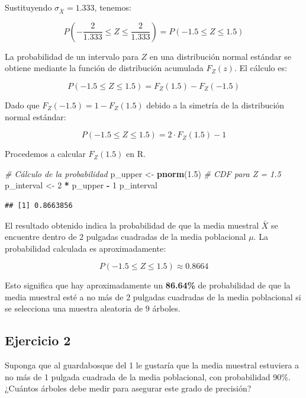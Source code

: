 \documentclass[
]{article}
\newenvironment{Shaded}{\begin{snugshade}}{\end{snugshade}}
\newcommand{\CommentTok}[1]{\textcolor[rgb]{0.56,0.35,0.01}{\textit{#1}}}
\newcommand{\DecValTok}[1]{\textcolor[rgb]{0.00,0.00,0.81}{#1}}
\newcommand{\FloatTok}[1]{\textcolor[rgb]{0.00,0.00,0.81}{#1}}
\newcommand{\FunctionTok}[1]{\textcolor[rgb]{0.13,0.29,0.53}{\textbf{#1}}}
\newcommand{\NormalTok}[1]{#1}
\newcommand{\OtherTok}[1]{\textcolor[rgb]{0.56,0.35,0.01}{#1}}
\newcommand{\SpecialCharTok}[1]{\textcolor[rgb]{0.81,0.36,0.00}{\textbf{#1}}}
\begin{document}
Sustituyendo \(\sigma_{\bar{X}} = 1.333\), tenemos:

\[
P\left(-\frac{2}{1.333} \leq Z \leq \frac{2}{1.333}\right) = P(-1.5 \leq Z \leq 1.5)
\]

La probabilidad de un intervalo para \(Z\) en una distribución normal estándar se obtiene mediante la función de distribución acumulada \(F_Z(z)\). El cálculo es:

\[
P(-1.5 \leq Z \leq 1.5) = F_Z(1.5) - F_Z(-1.5)
\]

Dado que \(F_Z(-1.5) = 1 - F_Z(1.5)\) debido a la simetría de la distribución normal estándar:

\[
P(-1.5 \leq Z \leq 1.5) = 2 \cdot F_Z(1.5) - 1
\]

Procedemos a calcular \(F_Z(1.5)\) en R.

\begin{Shaded}
\begin{Highlighting}[]
\CommentTok{\# Cálculo de la probabilidad}
\NormalTok{p\_upper }\OtherTok{\textless{}{-}} \FunctionTok{pnorm}\NormalTok{(}\FloatTok{1.5}\NormalTok{) }\CommentTok{\# CDF para Z = 1.5}
\NormalTok{p\_interval }\OtherTok{\textless{}{-}} \DecValTok{2} \SpecialCharTok{*}\NormalTok{ p\_upper }\SpecialCharTok{{-}} \DecValTok{1}
\NormalTok{p\_interval}
\end{Highlighting}
\end{Shaded}

\begin{verbatim}
## [1] 0.8663856
\end{verbatim}

El resultado obtenido indica la probabilidad de que la media muestral \(\bar{X}\) se encuentre dentro de 2 pulgadas cuadradas de la media poblacional \(\mu\). La probabilidad calculada es aproximadamente:

\[
P(-1.5 \leq Z \leq 1.5) \approx 0.8664
\]

Esto significa que hay aproximadamente un \textbf{86.64\%} de probabilidad de que la media muestral esté a no más de 2 pulgadas cuadradas de la media poblacional si se selecciona una muestra aleatoria de 9 árboles.

\subsection{Ejercicio 2}\label{ejercicio-2-1}

Suponga que al guardabosque del 1 le gustaría que la media muestral estuviera a no más de 1 pulgada cuadrada de la media poblacional, con probabilidad 90\%. ¿Cuántos árboles debe medir para asegurar este grado de precisión?
\end{document}
